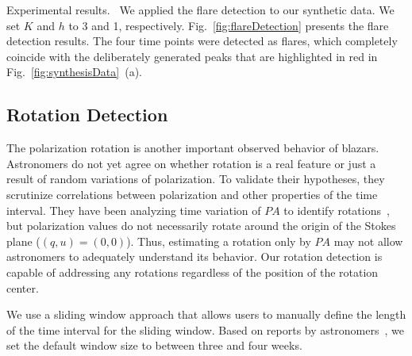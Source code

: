 \textsf{Experimental results.\ } We applied the flare detection to our synthetic data.
We set $K$ and $h$ to 3 and 1, respectively.
Fig.~\ref{fig:flareDetection} presents the flare detection results.
The four time points were detected as flares,
which completely coincide with the deliberately generated peaks that are highlighted in red in Fig.~\ref{fig:synthesisData}~(a).

\subsection{Rotation Detection}\label{sec:rotationDetection}
The polarization rotation is another important observed behavior of blazars. 
Astronomers do not yet agree on whether rotation is a real feature or just a result of random variations of polarization.
To validate their hypotheses, they scrutinize correlations between polarization and other properties of the time interval.
They have been analyzing time variation of $PA$ to identify rotations~\cite{Ikejiri2011, Uemura2017},
but polarization values do not necessarily rotate around the origin of the Stokes plane ($(q, u) = (0, 0)$).
Thus, estimating a rotation only by $PA$ may not allow astronomers to adequately understand its behavior.
Our rotation detection is capable of addressing any rotations regardless of the position of the rotation center.

We use a sliding window approach that allows users to manually define the length of the time interval for the sliding window. Based on reports by astronomers~\cite{Sasada2012}, we set the default window size to between three and four weeks.

